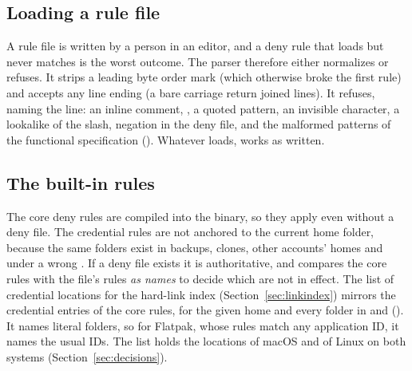 \subsection{Loading a rule file}

A rule file is written by a person in an editor, and a deny rule that loads but never
matches is the worst outcome.  The parser therefore either normalizes or refuses.  It
strips a leading byte order mark (which otherwise broke the first rule) and accepts any
line ending (a bare carriage return joined lines).  It refuses, naming the line: an
inline comment, , a quoted pattern, an invisible character, a lookalike
of the slash, negation in the deny file, and the malformed patterns of the
functional specification ().  Whatever loads, works as written.

\subsection{The built-in rules}

The core deny rules are compiled into the binary, so they apply even without a deny
file.  The credential rules are not anchored to the current home folder, because the same
folders exist in backups, clones, other accounts' homes and under a wrong .  If
a deny file exists it is authoritative, and  compares the core rules with the
file's rules \emph{as names} to decide which are not in effect.  The list of credential
locations for the hard-link index (Section~\ref{sec:linkindex}) mirrors the credential entries of
the core rules, for the given home and every folder in  and 
().  It names literal folders, so for Flatpak, whose rules match any
application ID, it names the usual IDs.  The list holds the locations of macOS and of
Linux on both systems (Section~\ref{sec:decisions}).
